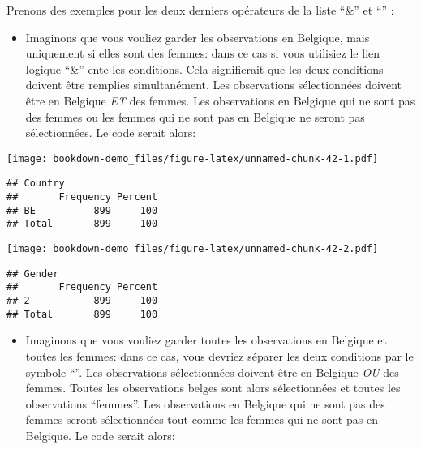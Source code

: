 \documentclass[
]{book}
\newenvironment{Shaded}{\begin{snugshade}}{\end{snugshade}}
\newcommand{\CommentTok}[1]{\textcolor[rgb]{0.56,0.35,0.01}{\textit{#1}}}
\newcommand{\DecValTok}[1]{\textcolor[rgb]{0.00,0.00,0.81}{#1}}
\newcommand{\FunctionTok}[1]{\textcolor[rgb]{0.00,0.00,0.00}{#1}}
\newcommand{\NormalTok}[1]{#1}
\newcommand{\OtherTok}[1]{\textcolor[rgb]{0.56,0.35,0.01}{#1}}
\newcommand{\SpecialCharTok}[1]{\textcolor[rgb]{0.00,0.00,0.00}{#1}}
\newcommand{\StringTok}[1]{\textcolor[rgb]{0.31,0.60,0.02}{#1}}
\providecommand{\tightlist}{%
  \setlength{\itemsep}{0pt}\setlength{\parskip}{0pt}}
\begin{document}
Prenons des exemples pour les deux derniers opérateurs de la liste ``\&'' et ``\textbar{}'' :

\begin{itemize}
\tightlist
\item
  Imaginons que vous vouliez garder les observations en Belgique, mais uniquement si elles sont des femmes: dans ce cas si vous utilisiez le lien logique ``\&'' ente les conditions. Cela signifierait que les deux conditions doivent être remplies simultanément. Les observations sélectionnées doivent être en Belgique \emph{ET} des femmes. Les observations en Belgique qui ne sont pas des femmes ou les femmes qui ne sont pas en Belgique ne seront pas sélectionnées. Le code serait alors:
\end{itemize}

\begin{Shaded}
\end{Shaded}

\texttt{[image: bookdown-demo\_files/figure-latex/unnamed-chunk-42-1.pdf]}

\begin{verbatim}
## Country 
##       Frequency Percent
## BE          899     100
## Total       899     100
\end{verbatim}

\begin{Shaded}
\end{Shaded}

\texttt{[image: bookdown-demo\_files/figure-latex/unnamed-chunk-42-2.pdf]}

\begin{verbatim}
## Gender 
##       Frequency Percent
## 2           899     100
## Total       899     100
\end{verbatim}

\begin{itemize}
\tightlist
\item
  Imaginons que vous vouliez garder toutes les observations en Belgique et toutes les femmes: dans ce cas, vous devriez séparer les deux conditions par le symbole ``\textbar{}''. Les observations sélectionnées doivent être en Belgique \emph{OU} des femmes. Toutes les observations belges sont alors sélectionnées et toutes les observations ``femmes''. Les observations en Belgique qui ne sont pas des femmes seront sélectionnées tout comme les femmes qui ne sont pas en Belgique. Le code serait alors:
\end{itemize}
\end{document}
